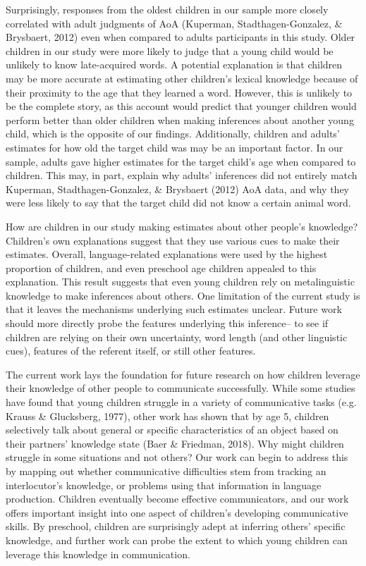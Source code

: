 \documentclass[10pt, letterpaper]{article}
\begin{document}
Surprisingly, responses from the oldest children in our sample more
closely correlated with adult judgments of AoA (Kuperman,
Stadthagen-Gonzalez, \& Brysbaert, 2012) even when compared to adults
participants in this study. Older children in our study were more likely
to judge that a young child would be unlikely to know late-acquired
words. A potential explanation is that children may be more accurate at
estimating other children's lexical knowledge because of their proximity
to the age that they learned a word. However, this is unlikely to be the
complete story, as this account would predict that younger children
would perform better than older children when making inferences about
another young child, which is the opposite of our findings.
Additionally, children and adults' estimates for how old the target
child was may be an important factor. In our sample, adults gave higher
estimates for the target child's age when compared to children. This
may, in part, explain why adults' inferences did not entirely match
Kuperman, Stadthagen-Gonzalez, \& Brysbaert (2012) AoA data, and why
they were less likely to say that the target child did not know a
certain animal word.

How are children in our study making estimates about other people's
knowledge? Children's own explanations suggest that they use various
cues to make their estimates. Overall, language-related explanations
were used by the highest proportion of children, and even preschool age
children appealed to this explanation. This result suggests that even
young children rely on metalinguistic knowledge to make inferences about
others. One limitation of the current study is that it leaves the
mechanisms underlying such estimates unclear. Future work should more
directly probe the features underlying this inference-- to see if
children are relying on their own uncertainty, word length (and other
linguistic cues), features of the referent itself, or still other
features.

The current work lays the foundation for future research on how children
leverage their knowledge of other people to communicate successfully.
While some studies have found that young children struggle in a variety
of communicative tasks (e.g. Krauss \& Glucksberg, 1977), other work has
shown that by age 5, children selectively talk about general or specific
characteristics of an object based on their partners' knowledge state
(Baer \& Friedman, 2018). Why might children struggle in some situations
and not others? Our work can begin to address this by mapping out
whether communicative difficulties stem from tracking an interlocutor's
knowledge, or problems using that information in language production.
Children eventually become effective communicators, and our work offers
important insight into one aspect of children's developing communicative
skills. By preschool, children are surprisingly adept at inferring
others' specific knowledge, and further work can probe the extent to
which young children can leverage this knowledge in communication.
\end{document}
